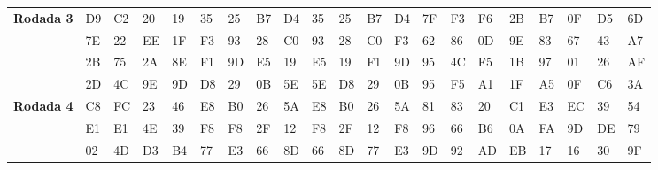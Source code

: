 \documentclass[
    article,            %
    11pt,               %
    oneside,            %
    a4paper,            %
    english,            %
    brazil,             %
    sumario=tradicional,
    ]{abntex2}
\begin{document}
\begin{table}[H]
{\begin{tabular}{|
>{\columncolor[HTML]{C0C0C0}}l |llll|llll|llll|llll|llll|}
\textbf{Rodada 3}                                                    & D9            & C2            & 20            & 19            & 35            & 25           & B7           & D4           & 35            & 25            & B7           & D4           & 7F            & F3            & F6            & 2B           & B7            & 0F            & D5            & 6D           \\
                                                     & 7E            & 22            & EE            & 1F            & F3            & 93           & 28           & C0           & 93            & 28            & C0           & F3           & 62            & 86            & 0D            & 9E           & 83            & 67            & 43            & A7           \\
                                                     & 2B            & 75            & 2A            & 8E            & F1            & 9D           & E5           & 19           & E5            & 19            & F1           & 9D           & 95            & 4C            & F5            & 1B           & 97            & 01             & 26            & AF           \\
                                                     & 2D            & 4C            & 9E            & 9D            & D8            & 29           & 0B           & 5E           & 5E            & D8            & 29           & 0B           & 95            & F5            & A1            & 1F           & A5            & 0F            & C6            & 3A           \\ \hline
\textbf{Rodada 4}                                                    & C8            & FC            & 23            & 46            & E8            & B0           & 26           & 5A           & E8            & B0            & 26           & 5A           & 81            & 83            & 20            & C1           & E3            & EC            & 39            & 54           \\
                                                     & E1            & E1            & 4E            & 39            & F8            & F8           & 2F           & 12           & F8            & 2F            & 12           & F8           & 96            & 66            & B6            & 0A           & FA            & 9D            & DE            & 79           \\
                                                     & 02             & 4D            & D3            & B4            & 77            & E3           & 66           & 8D           & 66            & 8D            & 77           & E3           & 9D            & 92            & AD            & EB           & 17            & 16            & 30            & 9F           \\

\end{tabular}}
\end{table}
\end{document}

